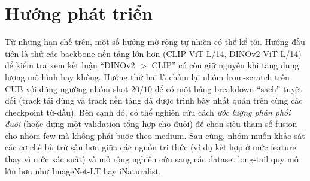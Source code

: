 \section{Hướng phát triển}

Từ những hạn chế trên, một số hướng mở rộng tự nhiên có thể kể tới. Hướng đầu tiên là thử các
backbone nền tảng lớn hơn (CLIP ViT-L/14, DINOv2 ViT-L/14) để kiểm tra xem kết luận ``DINOv2 $>$
CLIP'' có còn giữ nguyên khi tăng dung lượng mô hình hay không. Hướng thứ hai là chấm lại nhóm
from-scratch trên CUB với đúng ngưỡng nhóm-shot $20/10$ để có một bảng breakdown ``sạch'' tuyệt đối
(track tái dùng và track nền tảng đã được trình bày nhất quán trên cùng các checkpoint từ-đầu). Bên
cạnh đó, có thể nghiên cứu cách \emph{ước lượng phân phối đuôi} (hoặc
dựng một validation tổng hợp cho đuôi) để chọn siêu tham số fusion cho nhóm few mà không phải buộc
theo medium. Sau cùng, nhóm muốn khảo sát các cơ chế bù trừ sâu hơn giữa các nguồn tri thức (ví dụ
kết hợp ở mức feature thay vì mức xác suất) và mở rộng nghiên cứu sang các dataset long-tail quy mô
lớn hơn như ImageNet-LT hay iNaturalist.

